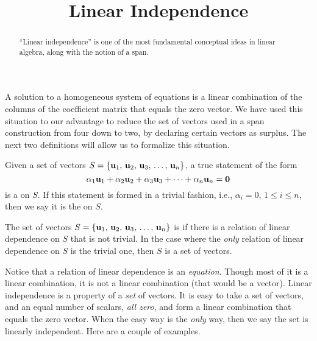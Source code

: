 \documentclass{ximera}
\title{Linear Independence}
\begin{document}
\begin{abstract}
  ``Linear independence'' is one of the most fundamental conceptual
  ideas in linear algebra, along with the notion of a span.
\end{abstract}
\maketitle

A solution to a homogeneous system of equations is a linear
combination of the columns of the coefficient matrix that equals the
zero vector.  We have used this situation to our advantage to reduce
the set of vectors used in a span construction from four down to two,
by declaring certain vectors as surplus.  The next two definitions
will allow us to formalize this situation.

\begin{definition}
Given a set of vectors $S=\left\{\mathbf{u}_{1},\,\mathbf{u}_{2},\,\mathbf{u}_{3},\,\ldots,\,\mathbf{u}_{n}\right\}$, a true statement of the form
\[
\alpha_{1}\mathbf{u}_{1}+\alpha_{2}\mathbf{u}_{2}+\alpha_{3}\mathbf{u}_{3}+\cdots +\alpha_{n}\mathbf{u}_{n}=\mathbf{0}
\]
is a  on $S$.  If this statement is formed in a trivial fashion, i.e.,  $\alpha_i=0$, $1\leq i\leq n$, then we say it is the  on $S$.
\end{definition}

\begin{definition}
The set of vectors $S=\left\{\mathbf{u}_{1},\,\mathbf{u}_{2},\,\mathbf{u}_{3},\,\ldots,\,\mathbf{u}_{n}\right\}$ is  if there is a relation of linear dependence on $S$ that is not trivial.  In the case where the \textit{only} relation of linear dependence on $S$ is the trivial one, then $S$ is a  set of vectors.
\end{definition}

Notice that a relation of linear dependence is an \textit{equation}.
Though most of it is a linear combination, it is not a linear
combination (that would be a vector).  Linear independence is a
property of a \textit{set} of vectors.  It is easy to take a set of
vectors, and an equal number of scalars, \textit{all zero}, and form a
linear combination that equals the zero vector.  When the easy way is
the \textit{only} way, then we say the set is linearly independent.
Here are a couple of examples.
\end{document}
